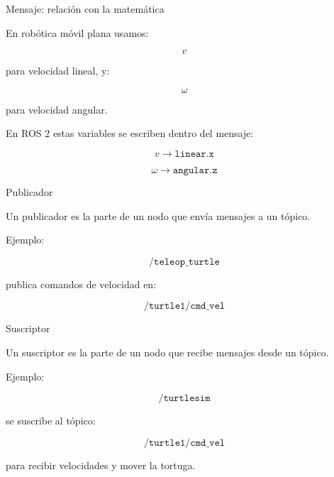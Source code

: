 \documentclass[aspectratio=169]{beamer}
\begin{document}
\begin{frame}{Mensaje: relación con la matemática}

    En robótica móvil plana usamos:

    \[
    v
    \]

    para velocidad lineal, y:

    \[
    \omega
    \]

    para velocidad angular.

    En ROS 2 estas variables se escriben dentro del mensaje:

    \[
    v \rightarrow \texttt{linear.x}
    \]

    \[
    \omega \rightarrow \texttt{angular.z}
    \]

    \vspace{-0.3cm}


\end{frame}

\begin{frame}{Publicador}

    Un publicador es la parte de un nodo que envía mensajes a un tópico.

    Ejemplo:

    \[
    \texttt{/teleop\_turtle}
    \]

    publica comandos de velocidad en:

    \[
    \texttt{/turtle1/cmd\_vel}
    \]

    \vspace{0.3cm}


\end{frame}

\begin{frame}{Suscriptor}

    Un suscriptor es la parte de un nodo que recibe mensajes desde un tópico.

    Ejemplo:

    \[
    \texttt{/turtlesim}
    \]

    se suscribe al tópico:

    \[
    \texttt{/turtle1/cmd\_vel}
    \]

    para recibir velocidades y mover la tortuga.

    \vspace{0.3cm}


\end{frame}
\end{document}
